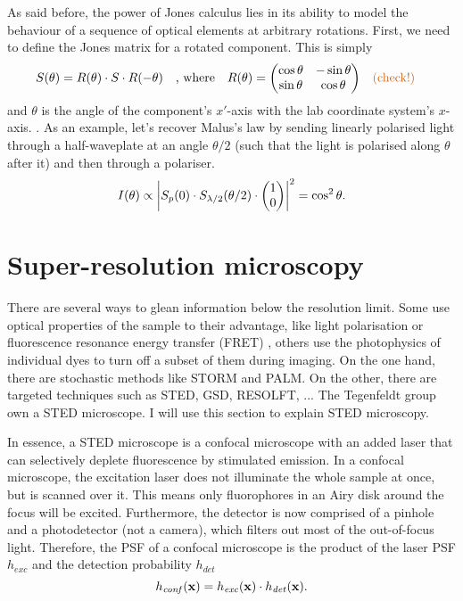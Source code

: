 As said before, the power of Jones calculus lies in its ability to model the behaviour of a sequence of optical elements at arbitrary rotations. First, we need to define the Jones matrix for a rotated component. This is simply
\begin{equation}
	S(\theta) = R(\theta) \cdot S \cdot R(-\theta) 
	\qq{, where} 
	R(\theta) = \mqty(\cos\theta & -\sin\theta \\ \sin\theta & \cos\theta) \qq{\todo{check!}}
\end{equation}
and $ \theta $ is the angle of the component's $ x' $-axis with the lab coordinate system's $ x $-axis. . As an example, let's recover Malus's law by sending linearly polarised light through a half-waveplate at an angle $ \theta/2 $ (such that the light is polarised along $ \theta $ after it) and then through a polariser.
\begin{equation}
	I(\theta) \propto \abs{S_p(0) \cdot S_\hwp(\theta/2) \cdot \mqty(\admat{1 \\ 0})}^2 = \cos^2\theta.
\end{equation}


\section{Super-resolution microscopy}

There are several ways to glean information below the resolution limit. Some use optical properties of the sample to their advantage, like light polarisation or fluorescence resonance energy transfer (FRET) \cite{Lerner2021}, others use the photophysics of individual dyes to turn off a subset of them during imaging.  On the one hand, there are stochastic methods like STORM and PALM. On the other, there are targeted techniques such as STED, GSD, RESOLFT, ...  The Tegenfeldt group own a STED microscope. I will use this section to explain STED microscopy.

In essence, a STED microscope is a confocal microscope with an added laser that can selectively deplete fluorescence by stimulated emission.  In a confocal microscope, the excitation laser does not illuminate the whole sample at once, but is scanned over it. This means only fluorophores in an Airy disk around the focus will be excited. Furthermore, the detector is now comprised of a pinhole and a photodetector (not a camera), which filters out most of the out-of-focus light. Therefore, the PSF of a confocal microscope is the product of the laser PSF $ h_\mathit{exc} $ and the detection probability $ h_\mathit{det} $
\begin{equation}
	h_\mathit{conf}(\vb{x}) = h_\mathit{exc}(\vb{x}) \cdot h_\mathit{det}(\vb{x}).
\end{equation}


